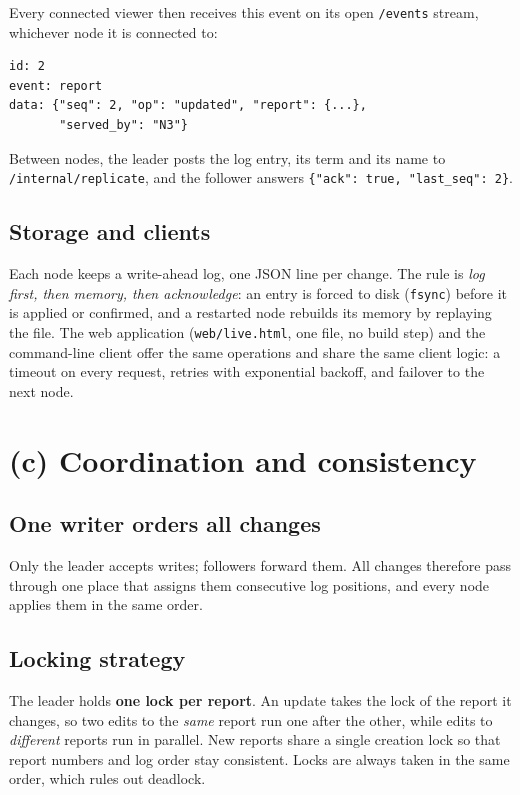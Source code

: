 \documentclass[10pt,a4paper]{article}
\newcommand{\code}[1]{\texttt{#1}}
\begin{document}
Every connected viewer then receives this event on its open \code{/events} stream, whichever node
it is connected to:
\begin{verbatim}
id: 2
event: report
data: {"seq": 2, "op": "updated", "report": {...},
       "served_by": "N3"}
\end{verbatim}

Between nodes, the leader posts the log entry, its term and its name to
\code{/internal/replicate}, and the follower answers \code{\{"ack": true, "last\_seq": 2\}}.

\subsection{Storage and clients}

Each node keeps a write-ahead log, one JSON line per change. The rule is \emph{log first, then
memory, then acknowledge}: an entry is forced to disk (\code{fsync}) before it is applied or
confirmed, and a restarted node rebuilds its memory by replaying the file. The web application
(\code{web/live.html}, one file, no build step) and the command-line client offer the same
operations and share the same client logic: a timeout on every request, retries with exponential
backoff, and failover to the next node.

\section{(c) Coordination and consistency}

\subsection{One writer orders all changes}

Only the leader accepts writes; followers forward them. All changes therefore pass through one
place that assigns them consecutive log positions, and every node applies them in the same order.

\subsection{Locking strategy}

The leader holds \textbf{one lock per report}. An update takes the lock of the report it changes,
so two edits to the \emph{same} report run one after the other, while edits to \emph{different}
reports run in parallel. New reports share a single creation lock so that report numbers and log
order stay consistent. Locks are always taken in the same order, which rules out deadlock.
\end{document}
